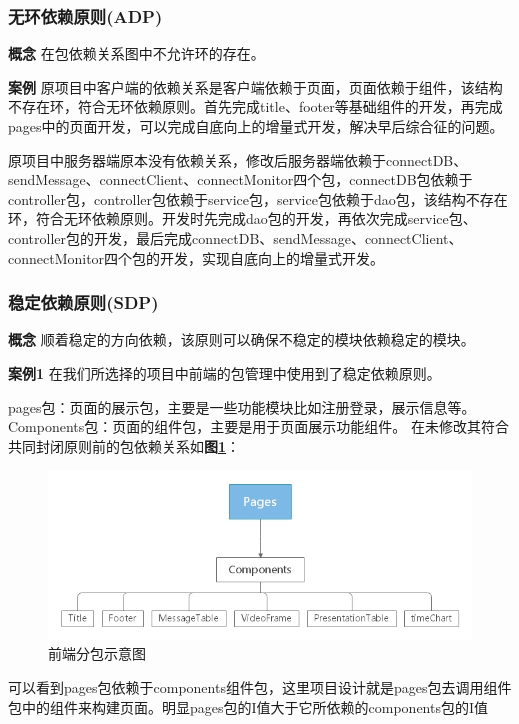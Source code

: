 \documentclass[article]{BJTU-thesis}
\begin{document}
\subsubsection{无环依赖原则(ADP)}
\textbf{概念} 在包依赖关系图中不允许环的存在。

\textbf{案例} 原项目中客户端的依赖关系是客户端依赖于页面，页面依赖于组件，该结构不存在环，符合无环依赖原则。首先完成title、footer等基础组件的开发，再完成pages中的页面开发，可以完成自底向上的增量式开发，解决早后综合征的问题。

原项目中服务器端原本没有依赖关系，修改后服务器端依赖于connectDB、sendMessage、connectClient、connectMonitor四个包，connectDB包依赖于controller包，controller包依赖于service包，service包依赖于dao包，该结构不存在环，符合无环依赖原则。开发时先完成dao包的开发，再依次完成service包、controller包的开发，最后完成connectDB、sendMessage、connectClient、connectMonitor四个包的开发，实现自底向上的增量式开发。

\subsubsection{稳定依赖原则(SDP)}
\textbf{概念} 顺着稳定的方向依赖，该原则可以确保不稳定的模块依赖稳定的模块。

\textbf{案例1} 在我们所选择的项目中前端的包管理中使用到了稳定依赖原则。

pages包：页面的展示包，主要是一些功能模块比如注册登录，展示信息等。
Components包：页面的组件包，主要是用于页面展示功能组件。
在未修改其符合共同封闭原则前的包依赖关系如\textbf{图\ref{fig:fig20}}：

\begin{figure}[!htbp]
	\centering
	\includegraphics[scale=0.8]{img/17.jpg}
	\caption{前端分包示意图}\label{fig:fig20}
\end{figure}

可以看到pages包依赖于components组件包，这里项目设计就是pages包去调用组件包中的组件来构建页面。明显pages包的I值大于它所依赖的components包的I值
\end{document}
